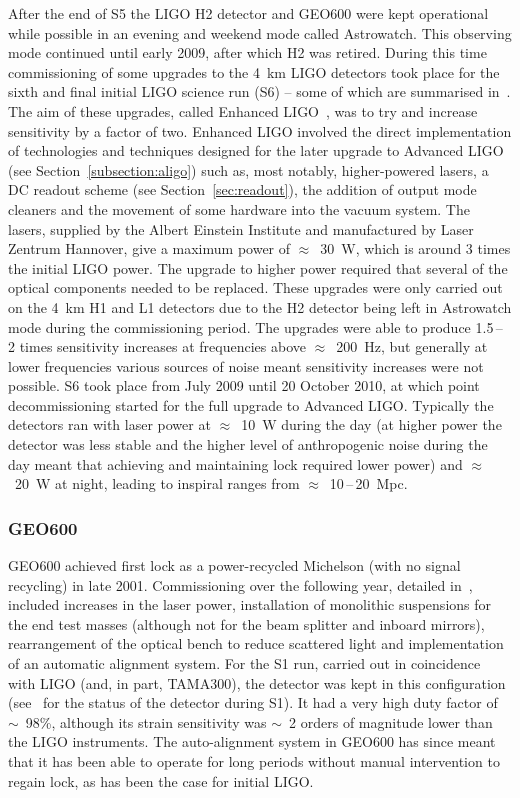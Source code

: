 \documentclass{article}
\begin{document}
After the end of S5 the LIGO H2 detector and GEO600 were kept operational while
possible in an evening and weekend mode called Astrowatch. This observing mode
continued until early 2009, after which H2 was retired. During this time
commissioning of some upgrades to the 4~km LIGO detectors took place for the
sixth and final initial LIGO science run (S6) -- some of which are
summarised in~\cite{Whitcomb:2008}. The aim of these upgrades, called
Enhanced LIGO~\cite{EnhancedLIGO}, was to try and  increase
sensitivity by a factor of two. Enhanced LIGO involved the direct
implementation of technologies and techniques designed for the later
upgrade to Advanced LIGO (see Section~\ref{subsection:aligo}) such as,
most notably, higher-powered lasers, a DC readout scheme (see
Section~\ref{sec:readout}), the addition of output mode cleaners and
the movement of some hardware into the vacuum system. The lasers,
supplied by the Albert Einstein Institute and manufactured by Laser
Zentrum Hannover, give a maximum power of $\approx$~30~W, which is
around 3 times the initial LIGO power. The upgrade to higher power
required that several of the optical components needed to be
replaced. These upgrades were only carried out on the 4~km H1 and L1
detectors due to the H2 detector being left in Astrowatch mode during
the commissioning period. The upgrades were able to produce 1.5\,--\,2
times sensitivity increases at frequencies above $\approx$~200~Hz, but
generally at lower frequencies various sources of noise meant
sensitivity increases were not possible. S6 took place from July 2009
until 20 October 2010, at which point decommissioning started for the
full upgrade to Advanced LIGO. Typically the detectors ran with laser
power at $\approx$~10~W during the day (at higher power the detector
was less stable and the higher level of anthropogenic noise during the
day meant that achieving and maintaining lock required lower power)
and $\approx$~20~W at night, leading to inspiral ranges from
$\approx$~10\,--\,20~Mpc.

\subsubsection{GEO600}

GEO600 achieved first lock as a power-recycled Michelson (with no signal
recycling) in late 2001. Commissioning over the following year,
detailed in~\cite{Hewitson:2003}, included increases in the laser
power, installation of monolithic suspensions for the end test masses
(although not for the beam splitter and inboard mirrors),
rearrangement of the optical bench to reduce scattered light and
implementation of an automatic alignment system. For the S1 run,
carried out in coincidence with LIGO (and, in part, TAMA300), the
detector was kept in this configuration (see~\cite{Abbott:2004a} for
the status of the detector during S1). It had a very high duty factor
of $\sim$~98\%, although its strain sensitivity was $\sim$~2 orders of
magnitude lower than the LIGO instruments. The auto-alignment system
in GEO600 has since meant that it has been able to operate for long
periods without manual intervention to regain lock, as has been the
case for initial LIGO.
\end{document}
